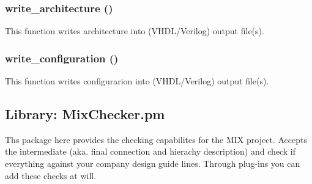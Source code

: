 \documentclass[a4paper,12pt]{article}
\begin{document}
\subsubsection{write\_architecture ()}
This function writes architecture into (VHDL/Verilog) output file(s).

\subsubsection{write\_configuration ()}
This function writes configurarion into (VHDL/Verilog) output file(s).

\subsection{Library: MixChecker.pm}
Ths package here provides the checking capabilites for the MIX project. Accepts the intermediate (aka. final connection and hierachy description) and check if everything against your company design guide lines. Through plug-ins you can add these checks at will.

\end{document}
